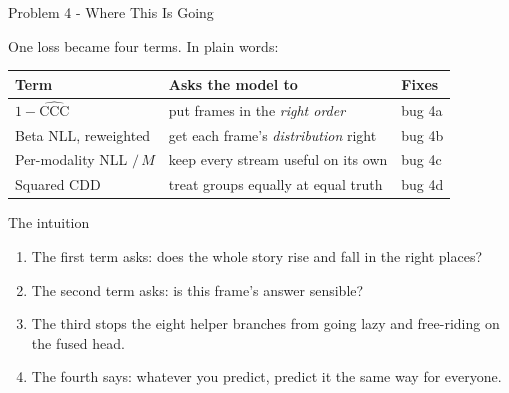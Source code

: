 \documentclass[aspectratio=169]{beamer}
\begin{document}
	\begin{frame}{Problem 4 - Where This Is Going}
		\begin{block}{One loss became four terms. In plain words:}
			\small
			\begin{tabular}{lll}
				\textbf{Term} & \textbf{Asks the model to} & \textbf{Fixes} \\
				\hline
				$1 - \widehat{\text{CCC}}$ & put frames in the \emph{right order} & bug 4a \\
				Beta NLL, reweighted & get each frame's \emph{distribution} right & bug 4b \\
				Per-modality NLL $/\,M$ & keep every stream useful on its own & bug 4c \\
				Squared CDD & treat groups equally at equal truth & bug 4d \\
			\end{tabular}
		\end{block}
		\vspace{0.3em}
		\begin{block}{The intuition}
			\small
			\begin{enumerate}
			    \item The first term asks: does the whole story rise and fall in the right places?
			    \item The second term asks: is this frame's answer sensible? 
			    \item The third stops the eight helper branches from going lazy and free-riding on the fused head. 
			    \item The fourth says: whatever you predict, predict it the same way for everyone.
			\end{enumerate}
		\end{block}
		\vspace{0.2em}
	\end{frame}
\end{document}
